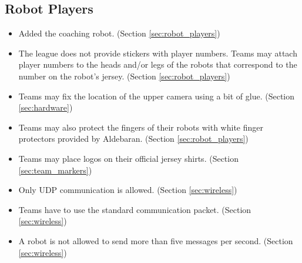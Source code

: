 \documentclass[12pt]{article}
\begin{document}
\subsection*{Robot Players}
\begin{itemize}
   \item Added the coaching robot. (Section \ref{sec:robot_players})
	\item The league does not provide stickers with player numbers.  Teams may attach player numbers to the heads and/or legs of the robots that correspond to the number on the robot's jersey. (Section \ref{sec:robot_players})
	\item Teams may fix the location of the upper camera using a bit of glue. (Section \ref{sec:hardware})
	\item Teams may also protect the fingers of their robots with white finger protectors provided by Aldebaran. (Section \ref{sec:robot_players})
	\item Teams may place logos on their official jersey shirts. (Section \ref{sec:team_markers})
	\item Only UDP communication is allowed. (Section \ref{sec:wireless})
    \item Teams have to use the standard communication packet. (Section \ref{sec:wireless})
    \item A robot is not allowed to send more than five messages per second. (Section \ref{sec:wireless})
\end{itemize}
\end{document}
